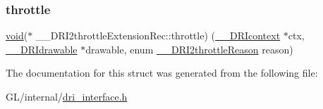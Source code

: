 \mbox{\label{struct_____d_r_i2throttle_extension_rec_aa98e6b8ca261dd0d14eb9713c18c88bf}} 
\subsubsection{\texorpdfstring{throttle}{throttle}}
{\footnotesize\ttfamily \hyperlink{_s_d_l__opengles2__gl2ext_8h_ae5d8fa23ad07c48bb609509eae494c95}{void}($\ast$ \+\_\+\+\_\+\+D\+R\+I2throttle\+Extension\+Rec\+::throttle) (\hyperlink{dri__interface_8h_a3fd295cba82b5a3d79f1ee7e12bfb908}{\+\_\+\+\_\+\+D\+R\+Icontext} $\ast$ctx, \hyperlink{dri__interface_8h_a5bfb832a0a08208d95b3bbef439d2262}{\+\_\+\+\_\+\+D\+R\+Idrawable} $\ast$drawable, enum \hyperlink{dri__interface_8h_a195f4ef9181a99d4aae51c5ba5ee32aa}{\+\_\+\+\_\+\+D\+R\+I2throttle\+Reason} reason)}



The documentation for this struct was generated from the following file\+:\begin{DoxyCompactItemize}
\item 
G\+L/internal/\hyperlink{dri__interface_8h}{dri\+\_\+interface.\+h}\end{DoxyCompactItemize}
